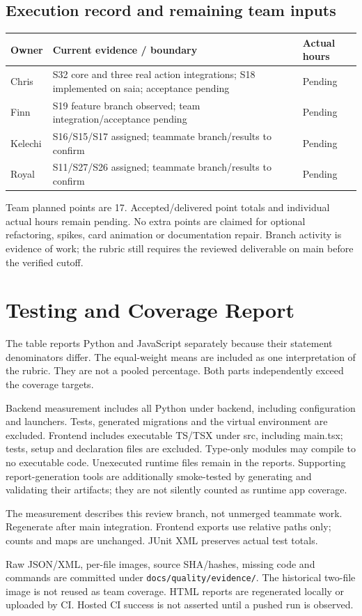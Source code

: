 \documentclass[11pt,a4paper]{article}
\begin{document}
\subsection{Execution record and remaining team inputs}
\begin{tabularx}{\textwidth}{@{}l X l@{}}
\toprule Owner & Current evidence / boundary & Actual hours\\\midrule
Chris & S32 core and three real action integrations; S18 implemented on saia; acceptance pending & Pending\\
Finn & S19 feature branch observed; team integration/acceptance pending & Pending\\
Kelechi & S16/S15/S17 assigned; teammate branch/results to confirm & Pending\\
Royal & S11/S27/S26 assigned; teammate branch/results to confirm & Pending\\\bottomrule
\end{tabularx}

Team planned points are 17. Accepted/delivered point totals and individual actual hours remain pending. No extra points are claimed for optional refactoring, spikes, card animation or documentation repair. Branch activity is evidence of work; the rubric still requires the reviewed deliverable on main before the verified cutoff.

\section{Testing and Coverage Report}

The table reports Python and JavaScript separately because their statement denominators differ. The equal-weight means are included as one interpretation of the rubric. They are not a pooled percentage. Both parts independently exceed the coverage targets.

Backend measurement includes all Python under backend, including configuration and launchers. Tests, generated migrations and the virtual environment are excluded. Frontend includes executable TS/TSX under src, including main.tsx; tests, setup and declaration files are excluded. Type-only modules may compile to no executable code. Unexecuted runtime files remain in the reports. Supporting report-generation tools are additionally smoke-tested by generating and validating their artifacts; they are not silently counted as runtime app coverage.

The measurement describes this review branch, not unmerged teammate work. Regenerate after main integration. Frontend exports use relative paths only; counts and maps are unchanged. JUnit XML preserves actual test totals.\par
Raw JSON/XML, per-file images, source SHA/hashes, missing code and commands are committed under \texttt{docs/quality/evidence/}. The historical two-file image is not reused as team coverage. HTML reports are regenerated locally or uploaded by CI. Hosted CI success is not asserted until a pushed run is observed.
\end{document}
